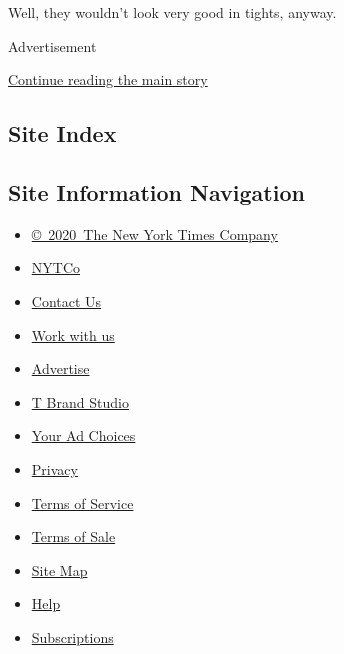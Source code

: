 Well, they wouldn't look very good in tights, anyway.

Advertisement

\protect\hyperlink{after-bottom}{Continue reading the main story}

\hypertarget{site-index}{%
\subsection{Site Index}\label{site-index}}

\hypertarget{site-information-navigation}{%
\subsection{Site Information
Navigation}\label{site-information-navigation}}

\begin{itemize}
\tightlist
\item
  \href{https://help.nytimes.com/hc/en-us/articles/115014792127-Copyright-notice}{©~2020~The
  New York Times Company}
\end{itemize}

\begin{itemize}
\tightlist
\item
  \href{https://www.nytco.com/}{NYTCo}
\item
  \href{https://help.nytimes.com/hc/en-us/articles/115015385887-Contact-Us}{Contact
  Us}
\item
  \href{https://www.nytco.com/careers/}{Work with us}
\item
  \href{https://nytmediakit.com/}{Advertise}
\item
  \href{http://www.tbrandstudio.com/}{T Brand Studio}
\item
  \href{https://www.nytimes.com/privacy/cookie-policy\#how-do-i-manage-trackers}{Your
  Ad Choices}
\item
  \href{https://www.nytimes.com/privacy}{Privacy}
\item
  \href{https://help.nytimes.com/hc/en-us/articles/115014893428-Terms-of-service}{Terms
  of Service}
\item
  \href{https://help.nytimes.com/hc/en-us/articles/115014893968-Terms-of-sale}{Terms
  of Sale}
\item
  \href{https://spiderbites.nytimes.com}{Site Map}
\item
  \href{https://help.nytimes.com/hc/en-us}{Help}
\item
  \href{https://www.nytimes.com/subscription?campaignId=37WXW}{Subscriptions}
\end{itemize}
